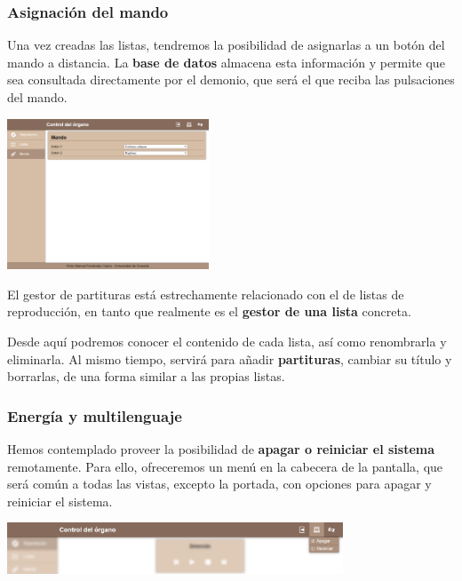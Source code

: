 \documentclass[10pt,a4paper]{article}
\begin{document}
	\subsubsection*{Asignación del mando}
	
	Una vez creadas las listas, tendremos la posibilidad de asignarlas a un botón del mando a distancia. La \textbf{base de datos} almacena esta información y permite que sea consultada directamente por el demonio, que será el que reciba las pulsaciones del mando.
	
	\begin{multicols}{2}
		\noindent
		\begin{center}
			\includegraphics[width=0.45\textwidth]{images/cap_mando} 
		\end{center}
		\columnbreak
		El gestor de partituras está estrechamente relacionado con el de listas de reproducción, en tanto que realmente es el \textbf{gestor de una lista} concreta. 
		
		Desde aquí podremos conocer el contenido de cada lista, así como renombrarla y eliminarla. Al mismo tiempo, servirá para añadir \textbf{partituras}, cambiar su título y borrarlas, de una forma similar a las propias listas.
	\end{multicols}
	
	\subsubsection*{Energía y multilenguaje}
	
	Hemos contemplado proveer la posibilidad de\textbf{ apagar o reiniciar el sistema} remotamente. Para ello, ofreceremos un menú en la cabecera de la pantalla, que será común a todas las vistas, excepto la portada, con opciones para apagar y reiniciar el sistema.
	
	\begin{center}
		\includegraphics[width=0.75\textwidth]{images/cap_repr_apagar} 
	\end{center}
	
\end{document}
